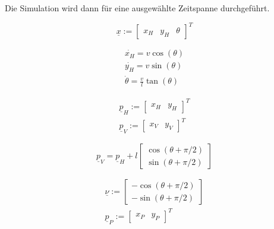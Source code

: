 \documentclass[arbeit=studie,oneside,BCOR=12mm]{ArbeitRST}
\begin{document}
Die Simulation wird dann für eine ausgewählte Zeitspanne durchgeführt.

    \begin{equation} 
        \underline{x} := 
        \begin{bmatrix}
            x_H & y_H & \theta
        \end{bmatrix}^T 
        \label{Zustandsvektor}
    \end{equation}

    \begin{gather}
        \dot{x_H} = v \cos(\theta) \\
        \dot{y_H} = v \sin(\theta) \\
        \dot{\theta} = \frac{v}{l}\tan(\theta)
    \end{gather}

    \begin{gather}
        \underline{p}_H := 
        \begin{bmatrix}
            x_H & y_H
        \end{bmatrix}^T \\
        \underline{p}_V := 
        \begin{bmatrix}
            x_V & y_V
        \end{bmatrix}^T
        \label{eq:Hinterradachse und Vorderradachse}
    \end{gather}

    \begin{equation}
        \underline{p}_V = \underline{p}_H + l 
        \begin{bmatrix}
            \cos(\theta + \pi/2) \\ 
            \sin(\theta + \pi/2)
        \end{bmatrix}
        \label{eq:Transformation von Hinterradachse zu Vorderradachse}
    \end{equation}

    \begin{gather}
        \underline{\nu} := 
        \begin{bmatrix}
            -\cos(\theta + \pi/2) \\
            -\sin(\theta + \pi/2)
        \end{bmatrix} \\
        \underline{p}_P := 
        \begin{bmatrix}
            x_P & y_P
        \end{bmatrix}^T
    \end{gather}
\end{document}
